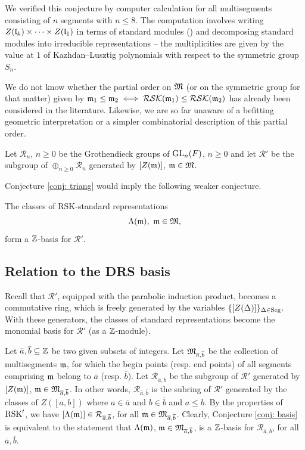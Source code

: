 \documentclass{ert-l} %
\begin{document}
We verified this conjecture by computer calculation for all multisegments consisting of $n$ segments with $n\le 8$.
The computation involves writing $Z(\mathfrak{l}_k)\times\dots\times Z(\mathfrak{l}_1)$ in terms of standard modules (\cite{MR3163355}) and decomposing standard modules into
irreducible representations -- the multiplicities are given by the value at $1$ of Kazhdan--Lusztig polynomials with respect to the symmetric group $S_n$.

We do not know whether the partial order on $\mathfrak{M}$ (or on the symmetric group for that matter)
given by $\mathfrak{m}_1\le\mathfrak{m}_2\iff\mathcal{RSK}(\mathfrak{m}_1)\le\mathcal{RSK}(\mathfrak{m}_2)$ has already been considered in the literature.
Likewise, we are so far unaware of a befitting geometric interpretation or a simpler combinatorial description of this partial order.


Let $\mathcal{R}_n$, $n\ge0$ be the Grothendieck groups of $\operatorname{GL}_n(F)$, $n\ge0$
and let $\mathcal{R}'$ be the subgroup of $\oplus_{n\ge0}\mathcal{R}_n$ generated by $[Z(\mathfrak{m})]$, $\mathfrak{m}\in\mathfrak{M}$.

Conjecture \ref{conj: triang} would imply the following weaker conjecture.

\begin{conjecture}\label{conj: basis}
The classes of RSK-standard representations
\[
\std(\m),\ \m\in\Mult,
\]
form a $\mathbb{Z}$-basis for $\mathcal{R}'$.
\end{conjecture}


\subsection{Relation to the DRS basis}\label{sec: rota}

Recall that $\mathcal{R}'$, equipped with the parabolic induction product, becomes a commutative ring, which is freely generated
by the variables $\{[Z(\Delta)]\}_{\Delta\in \operatorname{Seg}}$.
With these generators, the classes of standard representations become the monomial basis for $\mathcal{R}'$ (as a $\mathbb{Z}$-module).

Let $\overline{a}, \overline{b}\subseteq \mathbb{Z}$ be two given subsets of integers.
Let $\mathfrak{M}_{\overline{a},\overline{b}}$ be the collection of multisegments $\mathfrak{m}$,
for which the begin points (resp. end points) of all segments comprising $\mathfrak{m}$ belong to $\overline{a}$ (resp. $\overline{b}$).
Let $\mathcal{R}_{\overline{a},\overline{b}}$ be the subgroup of $\mathcal{R}'$ generated by $[Z(\mathfrak{m})]$,
$\mathfrak{m}\in\mathfrak{M}_{\overline{a},\overline{b}}$.
In other words, $\mathcal{R}_{\overline{a},\overline{b}}$ is the subring of $\mathcal{R}'$ generated by
the classes of $Z([a,b])$ where $a\in\overline{a}$ and $b\in\overline{b}$ and $a\le b$.
By the properties of $\operatorname{RSK}'$, we have $[\Lambda(\mathfrak{m})]\in \mathcal{R}_{\overline{a},\overline{b}}$, for all
$\mathfrak{m}\in \mathfrak{M}_{\overline{a},\overline{b}}$.
Clearly, Conjecture \ref{conj: basis} is equivalent to the statement that $\Lambda(\mathfrak{m})$, $\mathfrak{m}\in\mathfrak{M}_{\overline{a},\overline{b}}$,
is a $\mathbb{Z}$-basis for $\mathcal{R}_{\overline{a},\overline{b}}$, for all $\overline{a},\overline{b}$.
\end{document}
